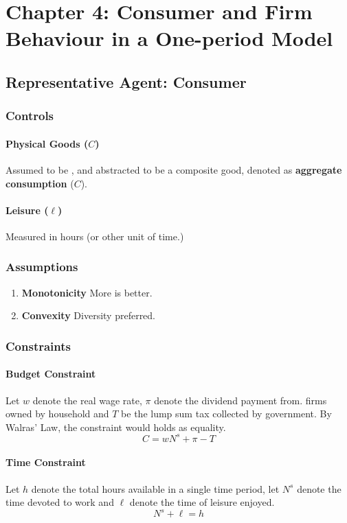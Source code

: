 \documentclass[11pt]{article}
\begin{document}
\section{Chapter 4: Consumer and Firm Behaviour in a One-period Model}
\subsection{Representative Agent: Consumer}
\subsubsection{Controls}
\paragraph{Physical Goods ($C$)} Assumed to be , and abstracted to be a composite good, denoted as \textbf{aggregate consumption} ($C$).
\paragraph{Leisure ($\ell$)} Measured in hours (or other unit of time.)

\subsubsection{Assumptions}
\begin{enumerate}
	\item \textbf{Monotonicity} More is better.
	\item \textbf{Convexity} Diversity preferred.
\end{enumerate}

\subsubsection{Constraints}
\paragraph{Budget Constraint} Let $w$ denote the real wage rate, $\pi$ denote the dividend payment from. firms owned by household and $T$ be the lump sum tax collected by government. By Walras' Law, the constraint would holds as equality.
\begin{equation}
	C = w N^s + \pi - T
\end{equation}

\paragraph{Time Constraint} Let $h$ denote the total hours available in a single time period, let $N^s$ denote the time devoted to work and $\ell$ denote the time of leisure enjoyed.
\begin{equation}
	N^s + \ell = h
\end{equation}
\end{document}
